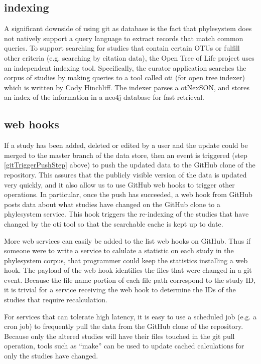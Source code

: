 \documentclass{bioinfo}
\newcommand{\ps}{phylesystem\xspace}
\newcommand{\otol}{Open Tree of Life\xspace}
\newcommand{\nexson}{otNexSON\xspace}
\begin{document}
\begin{methods}
\subsection{indexing}
A significant downside of using git as database is the fact that \ps does not natively support a query language
    to extract records that match common queries.
To support searching for studies that contain certain OTUs or fulfill other criteria (e.g. searching by citation data), 
    the \otol project uses an independent indexing tool.
Specifically, the curator application searches the corpus of studies by making queries to a tool called oti (for 
    open tree indexer) which is written by Cody Hinchliff.
The indexer parses a \nexson, and stores an index of the information in a neo4j database for fast retrieval.

\subsection{web hooks}
If a study has been added, deleted or edited by a user and the update could be merged to the master branch of the data store,
    then an event is triggered (step \ref{gitTriggerPushStep} above) to push the updated data to the GitHub clone
    of the repository.
This assures that the publicly visible version of the data is updated very quickly, and it also allow us to use
    GitHub web hooks to trigger other operations.
In particular, once the push has succeeded, a web hook from GitHub posts data about what studies have changed
    on the GitHub clone to a \ps service.
This hook triggers the re-indexing of the studies that have changed by the oti tool so that the searchable cache is
    kept up to date.

More web services can easily be added to the list web hooks on GitHub.
Thus if someone were to write a service to calulate a statistic on each study in the \ps corpus, that
    programmer could keep the statistics installing a web hook.
The payload of the web hook identifies the files that were changed in a git event.
Because the file name portion of each file path correspond to the study ID, it is trivial for a service
    receiving the web hook to determine the IDs of the studies that require recalculation.

For services that can tolerate high latency, it is easy to use a scheduled job (e.g. a cron job) to 
    frequently pull the data from the GitHub clone of the repository.
Because only the altered studies will have their files touched in the git pull operation, tools such
    as ``make'' can be used to update cached calculations for only the studies have changed.
\end{methods}
\end{document}
